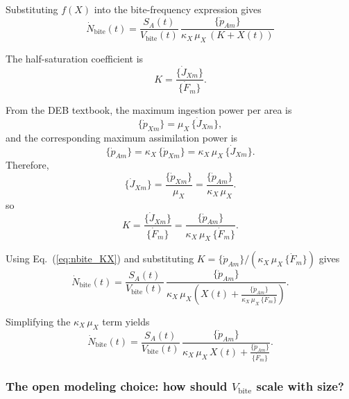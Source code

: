 \documentclass[11pt]{article}
\begin{document}
Substituting \(f(X)\) into the bite-frequency expression gives
\begin{equation}
\boxed{
\dot N_{\text{bite}}(t)
=
\frac{S_A(t)}{V_{\text{bite}}(t)}\,
\frac{\{\dot p_{Am}\}}{\kappa_X\,\mu_X\,(K + X(t))}
}
\label{eq:nbite_KX}
\end{equation}

The half-saturation coefficient is
\begin{equation}
K = \frac{\{\dot J_{X m}\}}{\{\dot F_m\}}.
\end{equation}

From the DEB textbook, the maximum ingestion power per area is
\begin{equation}
\{\dot p_{Xm}\} = \mu_X\,\{\dot J_{X m}\},
\end{equation}
and the corresponding maximum assimilation power is
\begin{equation}
\{\dot p_{Am}\} = \kappa_X\,\{\dot p_{Xm}\}
= \kappa_X\,\mu_X\,\{\dot J_{X m}\}.
\end{equation}
Therefore,
\begin{equation}
\{\dot J_{X m}\} = \frac{\{\dot p_{Xm}\}}{\mu_X}
= \frac{\{\dot p_{Am}\}}{\kappa_X\,\mu_X}.
\end{equation}
so
\begin{equation}
K = \frac{\{\dot J_{X m}\}}{\{\dot F_m\}}
= \frac{\{\dot p_{Am}\}}{\kappa_X\,\mu_X\,\{\dot F_m\}}.
\end{equation}

Using Eq.~(\ref{eq:nbite_KX}) and substituting \(K = \{\dot p_{Am}\}/(\kappa_X\,\mu_X\,\{\dot F_m\})\) gives
\begin{equation}
\boxed{
\dot N_{\text{bite}}(t)
=
\frac{S_A(t)}{V_{\text{bite}}(t)}\,
\frac{\{\dot p_{Am}\}}{\kappa_X\,\mu_X\left(X(t) + \frac{\{\dot p_{Am}\}}{\kappa_X\,\mu_X\,\{\dot F_m\}}\right)}
}.
\end{equation}

Simplifying the \(\kappa_X\,\mu_X\) term yields
\begin{equation}
\boxed{
\dot N_{\text{bite}}(t)
=
\frac{S_A(t)}{V_{\text{bite}}(t)}\,
\frac{\{\dot p_{Am}\}}{\kappa_X\,\mu_X\,X(t) + \frac{\{\dot p_{Am}\}}{\{\dot F_m\}}}
}.
\end{equation}

\subsubsection*{The open modeling choice: how should \(V_{\text{bite}}\) scale with size?}
\end{document}
